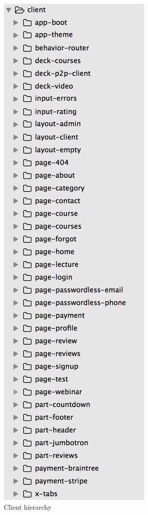 \begin{figure}[htbp] %
 \centering
 \includegraphics[width=0.5\linewidth]{images/chapter4/client.png}\hfill
 \caption[Client hierarchy]{Client hierarchy}
 \label{fig:fourV}
\end{figure}

\newpage